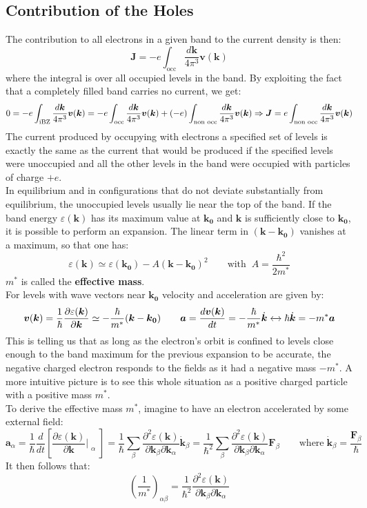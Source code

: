 \documentclass[10.75pt,a4paper,openright,bottom=2cm]{article}
\renewcommand{\Vec}[1]{\boldsymbol{#1}}
\newcommand{\RN}[1]{%
  \textup{\uppercase\expandafter{\romannumeral#1}}%
}
\begin{document}
\subsection{Contribution of the Holes}
The contribution to all electrons in a given band to the current density is then:
\[
\Vec{J}=-e\int_{\text{occ}}\frac{d\Vec{k}}{4\pi^3}\Vec{v}(\Vec{k})
\]
where the integral is over all occupied levels in the band. By exploiting the fact that a completely filled band carries no current, we get:
\[
0=-e\int_{\text{\RN{1}BZ}}\frac{d\Vec{k}}{4\pi^3}\Vec{v}(\Vec{k})=-e\int_{\text{occ}}\frac{d\Vec{k}}{4\pi^3}\Vec{v}(\Vec{k})+(-e)\int_{\text{non occ}}\frac{d\Vec{k}}{4\pi^3}\Vec{v}(\Vec{k})\Rightarrow\Vec{J}=e\int_{\text{non occ}}\frac{d\Vec{k}}{4\pi^3}\Vec{v}(\Vec{k})
\]
The current produced by occupying with electrons a specified set of levels is exactly the same as the current that would be produced if the specified levels were unoccupied and all the other levels in the band were occupied with particles of charge $+e$.\\
In equilibrium and in configurations that do not deviate substantially from equilibrium, the unoccupied levels usually lie near the top of the band. If the band energy $\varepsilon(\Vec{k})$ has its maximum value at $\Vec{k_0}$ and $\Vec{k}$ is sufficiently close to $\Vec{k_0}$, it is possible to perform an expansion. The linear term in $(\Vec{k}-\Vec{k_0})$ vanishes at a maximum, so that one has:
\[
\varepsilon(\Vec{k})\simeq \varepsilon(\Vec{k_0})-A(\Vec{k}-\Vec{k_0})^2 \qquad\text{with}\;\; A=\frac{\hbar^2}{2m^*}
\]
$m^*$ is called the \textbf{effective mass}.\\
For levels with wave vectors near $\Vec{k_0}$ velocity and acceleration are given by:
\[
\Vec{v}(\Vec{k})=\frac{1}{\hbar}\frac{\partial \varepsilon(\Vec{k})}{\partial\Vec{k}}\simeq-\frac{\hbar}{m^*}(\Vec{k}-\Vec{k_0}) \qquad \Vec{a}=\frac{d\Vec{v}(\Vec{k})}{dt}=-\frac{\hbar}{m^*}\Dot{\Vec{k}}\xleftrightarrow[]{}\hbar\Dot{\Vec{k}}=-m^*\Vec{a}
\]
This is telling us that as long as the electron's orbit is confined to levels close enough to the band maximum for the previous expansion to be accurate, the negative charged electron responds to the fields as it had a negative mass $-m^*$. A more intuitive picture is to see this whole situation as a positive charged particle with a positive mass $m^*$.\\
To derive the effective mass $m^*$, imagine to have an electron accelerated by some external field:
\[
\Vec{a}_\alpha=\frac{1}{\hbar}\frac{d}{dt}\left[\frac{\partial \varepsilon(\Vec{k})}{\partial\Vec{k}}\Bigr|_{\substack{\alpha}}\right]=\frac{1}{\hbar}\sum_\beta\frac{\partial^2\varepsilon(\Vec{k})}{\partial\Vec{k}_\beta\partial\Vec{k}_\alpha}\Dot{\Vec{k}}_\beta=\frac{1}{\hbar^2}\sum_\beta\frac{\partial^2\varepsilon(\Vec{k})}{\partial\Vec{k}_\beta\partial\Vec{k}_\alpha}\Vec{F}_\beta \qquad \text{where}\;\Dot{\Vec{k}}_\beta=\frac{\Vec{F}_\beta}{\hbar}
\]
It then follows that:
\[
\left(\frac{1}{m^*}\right)_{\alpha\beta}=\frac{1}{\hbar^2}\frac{\partial^2\varepsilon(\Vec{k})}{\partial\Vec{k}_\beta\partial\Vec{k}_\alpha}
\]
\newpage
\end{document}

